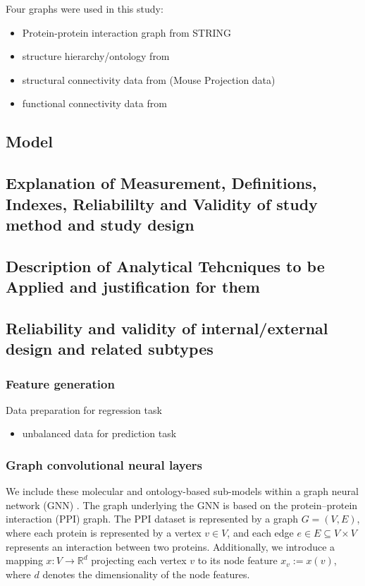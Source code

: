 \documentclass[]{article}
\renewcommand{\cite}{\citep}
\begin{document}
Four graphs were used in this study:
\begin{itemize}
	\item Protein-protein interaction graph from STRING
	\item structure hierarchy/ontology from \cite{MouseBrainAtlas}
	\item structural connectivity data from (Mouse Projection data)
	\item functional connectivity data from \cite{AIDAmri2019}
\end{itemize}

\subsection{Model}
\label{sec:modeldesc}
\subsection*{Explanation of Measurement, Definitions, Indexes, Reliabililty and Validity of study method and study design}
\subsection*{Description of Analytical Tehcniques to be Applied and justification for them}

\subsection*{Reliability and validity of internal/external design and related subtypes}

\subsubsection{Feature generation}

Data preparation for regression task
\begin{itemize}
	\item unbalanced data for prediction task
\end{itemize}

\subsubsection{Graph convolutional neural layers}
\label{sec:graphconv}
We include these molecular and ontology-based sub-models within a
graph neural network (GNN) \cite{GCNConv}. The graph underlying the GNN is
based on the protein--protein interaction (PPI) graph. The PPI dataset
is represented by a graph $G=(V,E)$, where each protein is represented
by a vertex $v\in V$, and each edge $e\in E\subseteq V\times V$
represents an interaction between two proteins. Additionally, we
introduce a mapping $x:V\rightarrow\mathbb{R}^{d}$ projecting each
vertex $v$ to its node feature $x_v := x(v)$, where $d$ denotes the
dimensionality of the node features.
\end{document}
